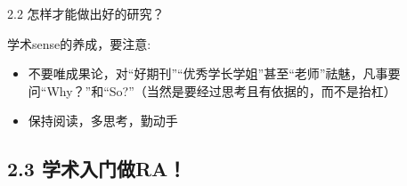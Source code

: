 \documentclass[10pt,aspectratio=43,mathserif,table]{beamer}
\begin{document}
\begin{frame}{\small 2.2 怎样才能做出好的研究？}
\begin{block}{\footnotesize 学术sense的养成，要注意:}
\begin{itemize}
			\item \footnotesize 不要唯成果论，对“好期刊”“优秀学长学姐”甚至“老师”祛魅，凡事要问“Why？”和“So?”（当然是要经过思考且有依据的，而不是抬杠）
			
			
			
			\vspace{0.7em}
			
			\item \footnotesize 保持阅读，多思考，勤动手
			

			
		\end{itemize}
	\end{block}
	
\end{frame}


\subsection{2.3 学术入门做RA！}
\end{document}
